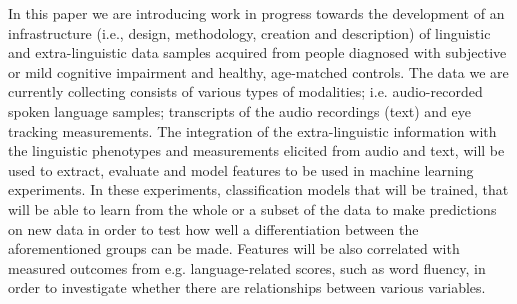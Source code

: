 In this paper we are introducing work in progress towards the development of an infrastructure (i.e., design, methodology, creation and description) of linguistic and extra-linguistic data samples acquired from people diagnosed with subjective or mild cognitive impairment and healthy, age-matched controls. The data we are currently collecting consists of various types of modalities; i.e. audio-recorded spoken language samples; transcripts of the audio recordings (text) and eye tracking measurements. The integration of the extra-linguistic information with the linguistic phenotypes and measurements elicited from audio and text, will be used to extract, evaluate and model features to be used in machine learning experiments. In these experiments, classification models that will be trained, that will be able to learn from the whole or a subset of the data to make predictions on new data in order to test how well a differentiation between the aforementioned groups can be made. Features will be also correlated with measured outcomes from e.g. language-related scores, such as word fluency, in order to investigate whether there are relationships between various variables.
